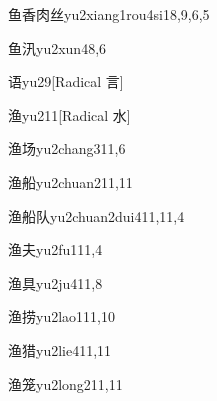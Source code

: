 \begin{entry}{鱼香肉丝}{yu2xiang1rou4si1}{8,9,6,5}
\end{entry}

\begin{entry}{鱼汛}{yu2xun4}{8,6}
\end{entry}

\begin{entry}{语}{yu2}{9}[Radical 言]
\end{entry}

\begin{entry}{渔}{yu2}{11}[Radical 水]
\end{entry}

\begin{entry}{渔场}{yu2chang3}{11,6}
\end{entry}

\begin{entry}{渔船}{yu2chuan2}{11,11}
\end{entry}

\begin{entry}{渔船队}{yu2chuan2dui4}{11,11,4}
\end{entry}

\begin{entry}{渔夫}{yu2fu1}{11,4}
\end{entry}

\begin{entry}{渔具}{yu2ju4}{11,8}
\end{entry}

\begin{entry}{渔捞}{yu2lao1}{11,10}
\end{entry}

\begin{entry}{渔猎}{yu2lie4}{11,11}
\end{entry}

\begin{entry}{渔笼}{yu2long2}{11,11}
\end{entry}

